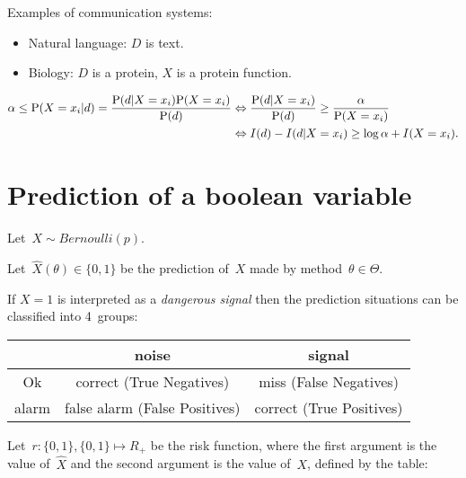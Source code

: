 \documentclass[10pt,a4paper]{article}
\theoremstyle{plain} \newtheorem{Lem}{Lemma}
\begin{document}
Examples of communication systems:
\begin{itemize}
\item Natural language: $D$ is text.
\item Biology: $D$ is a protein, $X$ is a protein function.
\end{itemize}

\begin{equation*}
\begin{split}
 \alpha \le \mathrm P(X=x_i|d) = \frac {\mathrm P(d|X=x_i) \mathrm P(X=x_i)} {\mathrm P(d)} &\Leftrightarrow \frac {\mathrm P(d|X=x_i)} {\mathrm P(d)} \ge  \frac \alpha {\mathrm P(X=x_i)} \\
   &\Leftrightarrow I(d) - I(d|X=x_i) \ge \log \alpha + I(X=x_i).
\end{split}
\end{equation*}


\section{Prediction of a boolean variable}

Let~$X \sim \mathit{Bernoulli}(p)$.

Let~$\hat X(\theta) \in \{0,1\}$ be the prediction of~$X$ made by method~$\theta \in \Theta$.

If $X=1$ is interpreted as a {\em dangerous signal} 
then the prediction situations can be classified into 4~groups:
\begin{center}
\begin{tabular}{|c||c|c|}
\hline       & noise       & signal \\
\hline 
\hline Ok    & correct (True Negatives)     & miss  (False Negatives)\\
\hline alarm & false alarm (False Positives)& correct (True Positives) \\
\hline
\end{tabular}
\end{center}

Let~$r : \{0,1\}, \{0,1\} \mapsto R_+$ be the risk function, 
where the first  argument is the value of~$\hat X$
and   the second argument is the value of~$X$,
defined by the table:
\end{document}
